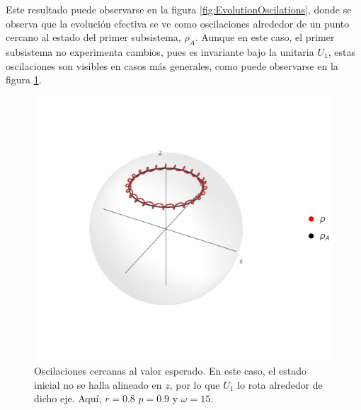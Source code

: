 Este resultado puede observarse en la figura \ref{fig:EvolutionOscilations}, donde se observa que la evolución efectiva se ve como oscilaciones alrededor de un punto cercano al estado del primer subsistema, $\rho_{A}$. Aunque en este caso, el primer subsistema no experimenta cambios, pues es invariante bajo la unitaria $U_{1}$, estas oscilaciones son visibles en casos más generales, como puede observarse en la figura \ref{fig:GeneralOscilations1}.

\begin{figure}[ht!]
    \centering
    \includegraphics[width=0.6\linewidth]{chapter3/figures_separable/U1xU2_H1=(sz)_H2=15(sx-sy)_z=0.8_p=0.9_wXY=0.5.png}
    \caption{Oscilaciones cercanas al valor esperado. En este caso, el estado inicial no se halla alineado en $z$, por lo que $U_{1}$ lo rota alrededor de dicho eje. Aquí, $r=0.8$ $p=0.9$ y $\omega=15$. }
    \label{fig:GeneralOscilations1}
\end{figure}



\pagebreak